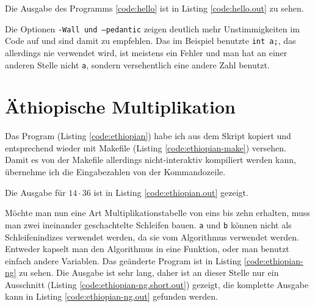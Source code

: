 \documentclass[12pt]{report}
\begin{document}
Die Ausgabe des Programms \ref{code:hello} ist in Listing \ref{code:hello.out} zu sehen.



Die Optionen \texttt{-Wall und --pedantic} zeigen deutlich mehr Unstimmigkeiten im Code auf und sind damit zu empfehlen. Das im Beispiel benutzte \texttt{int a;}, das allerdings nie verwendet wird, ist meistens ein Fehler und man hat an einer anderen Stelle nicht \texttt{a}, sondern versehentlich eine andere Zahl benutzt.

\section{Äthiopische Multiplikation}

Das Program (Listing \ref{code:ethiopian}) habe ich aus dem Skript kopiert und entsprechend wieder mit Makefile (Listing \ref{code:ethiopian-make}) versehen. Damit es von der Makefile allerdings nicht-interaktiv kompiliert werden kann, übernehme ich die Eingabezahlen von der Kommandozeile.



Die Ausgabe für $14 \cdot 36$ ist in Listing \ref{code:ethiopian.out} gezeigt.



Möchte man nun eine Art Multiplikationstabelle von eins bis zehn erhalten, muss man zwei ineinander geschachtelte Schleifen bauen. \texttt{a} und \texttt{b} können nicht als Schleifenindizes verwendet werden, da sie vom Algorithmus verwendet werden. Entweder kapselt man den Algorithmus in eine Funktion, oder man benutzt einfach andere Variablen. Das geänderte Program ist in Listing \ref{code:ethiopian-ng} zu sehen. Die Ausgabe  ist sehr lang, daher ist an dieser Stelle nur ein Ausschnitt (Listing \ref{code:ethiopian-ng.short.out}) gezeigt, die komplette Ausgabe kann in Listing \ref{code:ethiopian-ng.out} gefunden werden.





\end{document}
